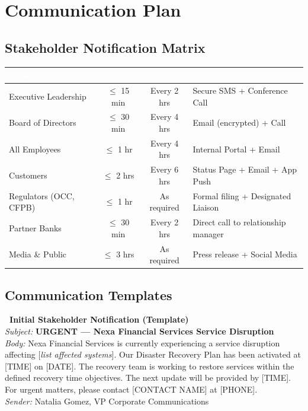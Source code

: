 \section{Communication Plan}

\subsection{Stakeholder Notification Matrix}

\begin{tcolorbox}[colback=lightgray, colframe=primary, boxrule=0.5pt, arc=3pt, left=10pt, right=10pt, top=8pt, bottom=8pt]
\begin{tabularx}{\textwidth}{@{}l c c X@{}}
  \toprule
  \rowcolor{tablehead}
  \textcolor{white}{\textbf{Stakeholder Group}} & \textcolor{white}{\textbf{Initial}} & \textcolor{white}{\textbf{Ongoing}} & \textcolor{white}{\textbf{Channel}}\\
  \midrule
  \rowcolor{tablerow}
  Executive Leadership & $\leqslant$ 15 min & Every 2 hrs & Secure SMS + Conference Call\\
  Board of Directors & $\leqslant$ 30 min & Every 4 hrs & Email (encrypted) + Call\\
  \rowcolor{tablerow}
  All Employees & $\leqslant$ 1 hr & Every 4 hrs & Internal Portal + Email\\
  Customers & $\leqslant$ 2 hrs & Every 6 hrs & Status Page + Email + App Push\\
  \rowcolor{tablerow}
  Regulators (OCC, CFPB) & $\leqslant$ 1 hr & As required & Formal filing + Designated Liaison\\
  Partner Banks & $\leqslant$ 30 min & Every 2 hrs & Direct call to relationship manager\\
  \rowcolor{tablerow}
  Media \& Public & $\leqslant$ 3 hrs & As required & Press release + Social Media\\
  \bottomrule
\end{tabularx}
\end{tcolorbox}

\subsection{Communication Templates}

\begin{infobox}
\textbf{\faBullhorn\ Initial Stakeholder Notification (Template)}\\[4pt]
\textit{Subject:} \textbf{URGENT --- Nexa Financial Services Service Disruption}\\[4pt]
\textit{Body:} Nexa Financial Services is currently experiencing a service disruption affecting [\textit{list affected systems}]. Our Disaster Recovery Plan has been activated at [TIME] on [DATE]. The recovery team is working to restore services within the defined recovery time objectives. The next update will be provided by [TIME]. For urgent matters, please contact [CONTACT NAME] at [PHONE].\\[4pt]
\textit{Sender:} Natalia Gomez, VP Corporate Communications
\end{infobox}
